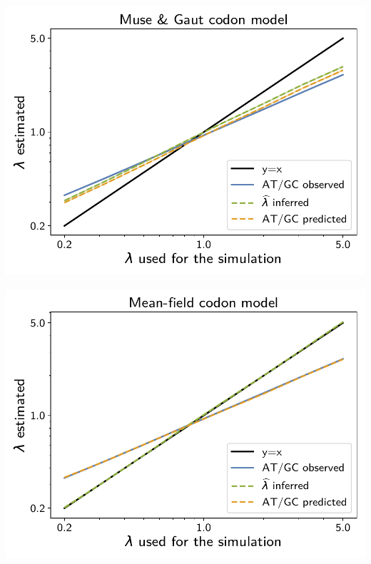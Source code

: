 \documentclass{article}
\begin{document}
\begin{center}
    \begin{minipage}{0.325\linewidth}
        \includegraphics[width=\linewidth, page=1]{inference_supp_mat/MammalsExons10Mu1.0_lambda_MG.pdf}
    \end{minipage}
    \hfill
    \begin{minipage}{0.325\linewidth}
        \includegraphics[width=\linewidth, page=1]{inference_supp_mat/MammalsExons10Mu1.0_lambda_MF.pdf}
    \end{minipage}
    \hfill

\end{center}
\end{document}

